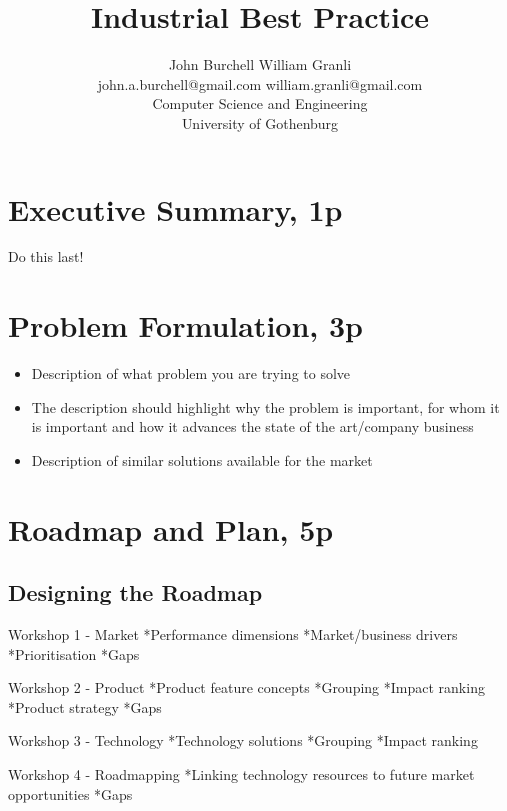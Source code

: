 \documentclass{article}
\title{Industrial Best Practice}
\begin{document}
\author{John Burchell \qquad William Granli \\
		john.a.burchell@gmail.com \qquad william.granli@gmail.com \\
		Computer Science and Engineering  \\
		University of Gothenburg }



\maketitle
\section{Executive Summary, 1p}
Do this last! 

\section{Problem Formulation, 3p}

\begin{itemize}
	\item Description of what problem you are trying to solve
	\item The description should highlight why the problem is important, for whom it is important and how it advances the state of the art/company business
	\item Description of similar solutions available for the market
\end{itemize}

\section{Roadmap and Plan, 5p}
\subsection{Designing the Roadmap}
Workshop 1 - Market
*Performance dimensions
*Market/business drivers
*Prioritisation
*Gaps

Workshop 2 - Product
*Product feature concepts
*Grouping
*Impact ranking
*Product strategy
*Gaps

Workshop 3 - Technology
*Technology solutions
*Grouping
*Impact ranking

Workshop 4 - Roadmapping
*Linking technology resources to future market opportunities
*Gaps
\end{document}

